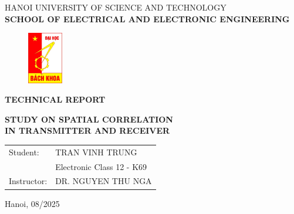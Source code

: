 \thispagestyle{empty}
\begin{center}
\vspace{-12pt}  HANOI UNIVERSITY OF SCIENCE AND TECHNOLOGY \\
\textbf{\fontsize{14pt}{0pt}\selectfont SCHOOL OF ELECTRICAL AND ELECTRONIC ENGINEERING}
\vspace{0.5cm}
 \begin{figure}[H]
     \centering
     \includegraphics[width=1.53cm,height=2.26cm]{Images/logodhbk.png}
 \end{figure}
\vspace{1.5cm}
\vspace{12pt}
\textbf{\fontsize{32pt}{0pt}\selectfont TECHNICAL REPORT}
\vspace{1.5cm}
\end{center}
\begin{center}
    \textbf{\fontsize{20pt}{0pt}\selectfont STUDY ON SPATIAL CORRELATION}\\
    \vspace{0.25cm}
    \textbf{\fontsize{20pt}{0pt}\selectfont IN TRANSMITTER AND RECEIVER}\\

\vspace{2cm}
\begin{table}[H]
    \centering
    \begin{tabular}{l l}
 \fontsize{14pt}{0pt}\selectfont Student:    & \fontsize{14pt}{0pt}\selectfont TRAN VINH TRUNG \vspace{6pt} \\ 
     & \fontsize{14pt}{0pt}\selectfont Electronic Class 12 - K69 \vspace{6pt}\\
\fontsize{14pt}{0pt}\selectfont Instructor: & \fontsize{14pt}{0pt}\selectfont DR. NGUYEN THU NGA \vspace{6pt}\\
\end{tabular}
\end{table}
\vspace{5cm}
 \fontsize{13pt}{0pt}\selectfont Hanoi, 08/2025
\end{center}
\cleardoublepage